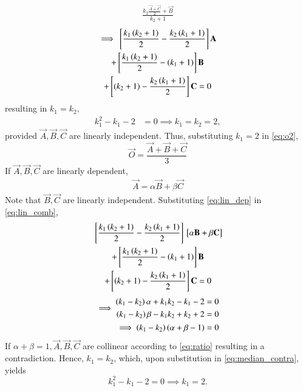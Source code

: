 \begin{enumerate}[label=\arabic*.,ref=\thesubsection.\theenumi]
\begin{align}
 \frac{k_2\frac{\vec{A} + \vec{C}}{2} + \vec{B}}{k_2+1}
\end{align}
\begin{multline}
\label{eq:lin_comb}
\implies {}\left[\frac{k_1\left(k_2+1\right)}{2}
-\frac{k_2\left(k_1+1\right)}{2}\right]\mathbf{A} 
\\
+ 
{}\left[\frac{k_1\left(k_2+1\right)}{2}-\left(k_1+1\right)\right]\mathbf{B} 
\\
+ {}\left[\left(k_2+1\right)-\frac{k_2\left(k_1+1\right)}{2}\right]\mathbf{C} 
= 0
\end{multline}
resulting in $k_1 = k_2$,
\begin{align}
k_1^2-k_1-2  &= 0
\implies k_1 = k_2 = 2,
\end{align}
provided $\vec{A},\vec{B},\vec{C}$ are linearly independent. Thus, substituting $k_1=2$ in \eqref{eq:o2},
\begin{equation}
\vec{O} = \frac{\vec{A}+\vec{B}+\vec{C}}{3}
\end{equation}
%
If $\vec{A},\vec{B},\vec{C}$ are linearly dependent,
\begin{align}
\label{eq:lin_dep}
\vec{A} = \alpha \vec{B} + \beta \vec{C} 
\end{align}
%
Note that $\vec{B},\vec{C}$ are linearly independent.
Substituting \eqref{eq:lin_dep} in \eqref{eq:lin_comb},
\begin{multline}
 {}\left[\frac{k_1\left(k_2+1\right)}{2}
-\frac{k_2\left(k_1+1\right)}{2}\right]{}\left[\alpha \mathbf{B} + \beta \mathbf{C}  \right]
\\
+ 
{}\left[\frac{k_1\left(k_2+1\right)}{2}-\left(k_1+1\right)\right]\mathbf{B} 
\\
+ {}\left[\left(k_2+1\right)-\frac{k_2\left(k_1+1\right)}{2}\right]\mathbf{C} 
= 0
\end{multline}
\begin{align}
\implies
\begin{split}
\left(k_1-k_2\right)\alpha + k_1k_2 - k_1-2 &=0
\\
\left(k_1-k_2\right)\beta - k_1k_2 + k_2+2 &=0
\end{split}
\label{eq:median_contra}
\\
\implies \left(k_1-k_2\right)\left(\alpha +\beta - 1\right) = 0
\end{align}
If $\alpha+\beta = 1, \vec{A},\vec{B},\vec{C}$ are collinear according to \eqref{eq:ratio} resulting in a 
contradiction.  Hence, $k_1=k_2$, which, upon substitution in \eqref{eq:median_contra}, yields
\begin{equation}
k_1^2 - k_1-2 = 0 \implies k_1 = 2.
\end{equation}


\end{enumerate}
